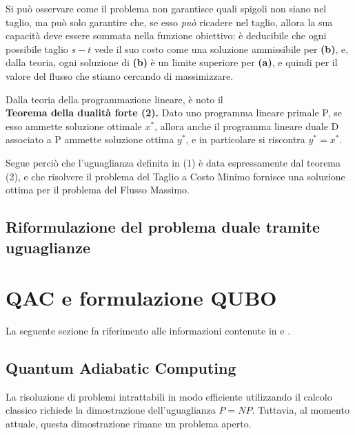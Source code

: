 \documentclass{article}
\begin{document}
Si può osservare come il problema non garantisce quali spigoli non siano nel taglio, ma può solo garantire che, se esso \emph{può} ricadere nel taglio, allora la sua capacità
deve essere sommata nella funzione obiettivo: è deducibile che ogni possibile taglio $s-t$ vede il suo costo come una soluzione ammissibile per \textbf{(b)}, e, dalla teoria, ogni
soluzione di \textbf{(b)} è un limite superiore per \textbf{(a)}, e quindi per il valore del flusso che stiamo cercando di massimizzare.

Dalla teoria della programmazione lineare, è noto il\\

\textbf{Teorema della dualità forte (2).} Dato uno programma lineare primale P, se esso ammette soluzione ottimale $x^*$, allora anche il programma lineare duale D associato a P 
ammette soluzione ottima $y^*$, e in particolare si riscontra $y^* = x^*$.

Segue perciò che l'uguaglianza definita in (1) è data espressamente dal teorema (2), e che risolvere il problema del Taglio a Costo Minimo fornisce una soluzione ottima per il 
problema del Flusso Massimo. 
\pagebreak

\subsection{Riformulazione del problema duale tramite \hfill \break uguaglianze}










\section{QAC e formulazione QUBO}
La seguente sezione fa riferimento alle informazioni contenute in \cite{MCGEOCH2020169} e \cite{DBLP:journals/corr/abs-1811-11538}.

\subsection{Quantum Adiabatic Computing}
La risoluzione di problemi intrattabili in modo efficiente utilizzando il calcolo classico richiede la dimostrazione dell'uguaglianza $P = NP$. Tuttavia, al momento attuale, questa dimostrazione rimane un problema aperto.
\end{document}
